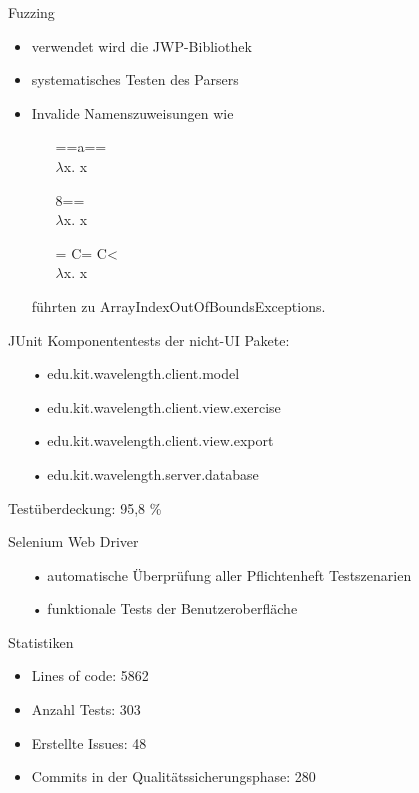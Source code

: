 \documentclass[10pt]{beamer}
\begin{document}
\begin{frame}{Fuzzing} %
\begin{itemize}
	\item verwendet wird die JWP-Bibliothek
	\item systematisches Testen des Parsers
	\newline
	\item Invalide Namenszuweisungen wie
	\begin{multicols}{3}
	\begin{itemize}
		\item[] ==a== \\ $\lambda$x. x
		\item[] 8== \\ $\lambda$x. x
		\item[] = C= C< \\ $\lambda$x. x
	\end{itemize}
	\end{multicols}
	führten zu ArrayIndexOutOfBoundsExceptions.
\end{itemize}
\end{frame}

\begin{frame}{JUnit}
Komponententests der nicht-UI Pakete:
\begin{itemize}
	\item[•] edu.kit.wavelength.client.model
	\item[•] edu.kit.wavelength.client.view.exercise
	\item[•] edu.kit.wavelength.client.view.export
	\item[•] edu.kit.wavelength.server.database
\end{itemize}
Testüberdeckung: 95,8 \%
\end{frame}

\begin{frame}{Selenium Web Driver}
\begin{itemize}
	\item[•] automatische Überprüfung aller Pflichtenheft Testszenarien
	\item[•] funktionale Tests der Benutzeroberfläche
\end{itemize}
\end{frame}

\begin{frame}{Statistiken} %
\begin{itemize}
\item Lines of code: 5862
\item Anzahl Tests: 303
\item Erstellte Issues: 48
\item Commits in der Qualitätssicherungsphase: 280
\end{itemize}
\end{frame}
\end{document}
